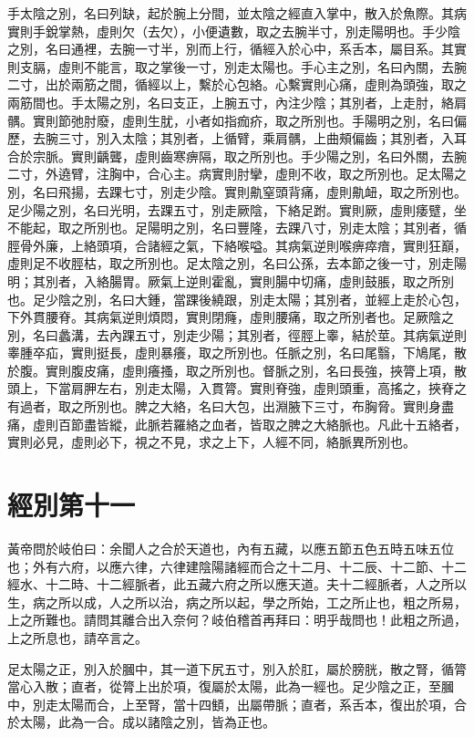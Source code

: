 手太陰之別，名曰列缺，起於腕上分間，並太陰之經直入掌中，散入於魚際。其病實則手銳掌熱，虛則欠（去欠），小便遺數，取之去腕半寸，別走陽明也。手少陰之別，名曰通裡，去腕一寸半，別而上行，循經入於心中，系舌本，屬目系。其實則支膈，虛則不能言，取之掌後一寸，別走太陽也。手心主之別，名曰內關，去腕二寸，出於兩筋之間，循經以上，繫於心包絡。心繫實則心痛，虛則為頭強，取之兩筋間也。手太陽之別，名曰支正，上腕五寸，內注少陰；其別者，上走肘，絡肩髃。實則節弛肘廢，虛則生肬，小者如指痂疥，取之所別也。手陽明之別，名曰偏歷，去腕三寸，別入太陰；其別者，上循臂，乘肩髃，上曲頰偏齒；其別者，入耳合於宗脈。實則齲聾，虛則齒寒痹隔，取之所別也。手少陽之別，名曰外關，去腕二寸，外遶臂，注胸中，合心主。病實則肘攣，虛則不收，取之所別也。足太陽之別，名曰飛揚，去踝七寸，別走少陰。實則鼽窒頭背痛，虛則鼽衄，取之所別也。足少陽之別，名曰光明，去踝五寸，別走厥陰，下絡足跗。實則厥，虛則痿躄，坐不能起，取之所別也。足陽明之別，名曰豐隆，去踝八寸，別走太陰；其別者，循脛骨外廉，上絡頭項，合諸經之氣，下絡喉嗌。其病氣逆則喉痹瘁瘖，實則狂巔，虛則足不收脛枯，取之所別也。足太陰之別，名曰公孫，去本節之後一寸，別走陽明；其別者，入絡腸胃。厥氣上逆則霍亂，實則腸中切痛，虛則鼓脹，取之所別也。足少陰之別，名曰大鍾，當踝後繞跟，別走太陽；其別者，並經上走於心包，下外貫腰脊。其病氣逆則煩悶，實則閉癃，虛則腰痛，取之所別者也。足厥陰之別，名曰蠡溝，去內踝五寸，別走少陽；其別者，徑脛上睾，結於莖。其病氣逆則睾腫卒疝，實則挺長，虛則暴癢，取之所別也。任脈之別，名曰尾翳，下鳩尾，散於腹。實則腹皮痛，虛則癢搔，取之所別也。督脈之別，名曰長強，挾膂上項，散頭上，下當肩胛左右，別走太陽，入貫膂。實則脊強，虛則頭重，高搖之，挾脊之有過者，取之所別也。脾之大絡，名曰大包，出淵腋下三寸，布胸脅。實則身盡痛，虛則百節盡皆縱，此脈若羅絡之血者，皆取之脾之大絡脈也。凡此十五絡者，實則必見，虛則必下，視之不見，求之上下，人經不同，絡脈異所別也。

\section{經別第十一}

黃帝問於岐伯曰：余聞人之合於天道也，內有五藏，以應五節五色五時五味五位也；外有六府，以應六律，六律建陰陽諸經而合之十二月、十二辰、十二節、十二經水、十二時、十二經脈者，此五藏六府之所以應天道。夫十二經脈者，人之所以生，病之所以成，人之所以治，病之所以起，學之所始，工之所止也，粗之所易，上之所難也。請問其離合出入奈何？岐伯稽首再拜曰：明乎哉問也！此粗之所過，上之所息也，請卒言之。

足太陽之正，別入於膕中，其一道下尻五寸，別入於肛，屬於膀胱，散之腎，循膂當心入散；直者，從膂上出於項，復屬於太陽，此為一經也。足少陰之正，至膕中，別走太陽而合，上至腎，當十四顀，出屬帶脈；直者，系舌本，復出於項，合於太陽，此為一合。成以諸陰之別，皆為正也。


